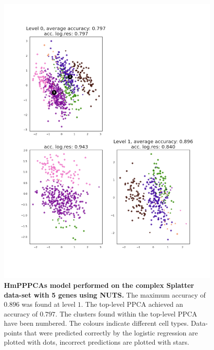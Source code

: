 \begin{figure}[h]
    \centering
    \includegraphics[width=.8\linewidth]{figs/complex_5_nuts.png}
    \caption[HmPPPCAs model performed on the complex Splatter data-set with 5 genes using NUTS]{\small \textbf{HmPPPCAs model performed on the complex Splatter data-set with 5 genes using NUTS.} \small The maximum accuracy of $0.896$ was found at level $1$. The top-level PPCA achieved an accuracy of $0.797$. The clusters found within the top-level PPCA have been numbered. The colours indicate different cell types. Data-points that were predicted correctly by the logistic regression are plotted with dots, incorrect predictions are plotted with stars.}
    \label{fig:complex_5_nuts}
\end{figure}

